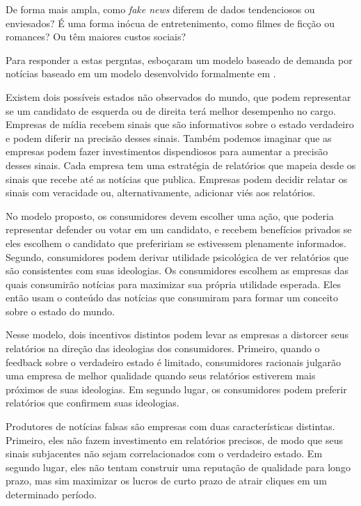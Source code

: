 De forma mais ampla, como \textit{fake news} diferem de dados tendenciosos ou enviesados? É uma forma inócua de entretenimento, como filmes de ficção ou romances? Ou têm maiores custos sociais? 

Para responder a estas pergntas, \cite{allcot2017} esboçaram um modelo baseado de demanda por notícias baseado em um modelo desenvolvido formalmente em \cite{gentzkow2016}. 

Existem dois possíveis estados não observados do mundo, que podem representar se um candidato de esquerda ou de direita terá melhor desempenho no cargo. 
Empresas de mídia recebem sinais que são informativos sobre o estado verdadeiro e podem diferir na
precisão desses sinais. 
Também podemos imaginar que as empresas podem fazer investimentos dispendiosos para aumentar a precisão desses sinais. 
Cada empresa tem uma estratégia de relatórios que mapeia desde os sinais que recebe até as notícias que publica. 
Empresas podem decidir relatar os sinais com veracidade ou, alternativamente, adicionar viés aos relatórios. 

No modelo proposto, os consumidores devem escolher uma ação, que poderia
representar defender ou votar em um candidato, e recebem benefícios privados se
eles escolhem o candidato que prefeririam se estivessem plenamente informados. 
Segundo,
consumidores podem derivar utilidade psicológica de ver relatórios que são consistentes com suas ideologias. 
Os consumidores escolhem as empresas das quais consumirão notícias
para maximizar sua própria utilidade esperada. 
Eles então usam o conteúdo das notícias que consumiram para formar um conceito sobre o estado do mundo. 

Nesse modelo, dois incentivos distintos podem levar as empresas a distorcer seus relatórios na direção das ideologias dos consumidores. 
Primeiro, quando o feedback sobre o verdadeiro estado é limitado,
consumidores racionais julgarão uma empresa de melhor qualidade quando seus relatórios estiverem mais próximos
de suas ideologias. 
Em segundo lugar, os consumidores podem preferir relatórios que confirmem suas ideologias. 

Produtores de notícias falsas são empresas com duas características distintas. Primeiro, eles não fazem
investimento em relatórios precisos, de modo que seus sinais subjacentes não sejam correlacionados com
o verdadeiro estado. 
Em segundo lugar, eles não tentam construir uma reputação de qualidade para longo prazo, mas sim maximizar os lucros de curto prazo de atrair cliques em um determinado período. 

